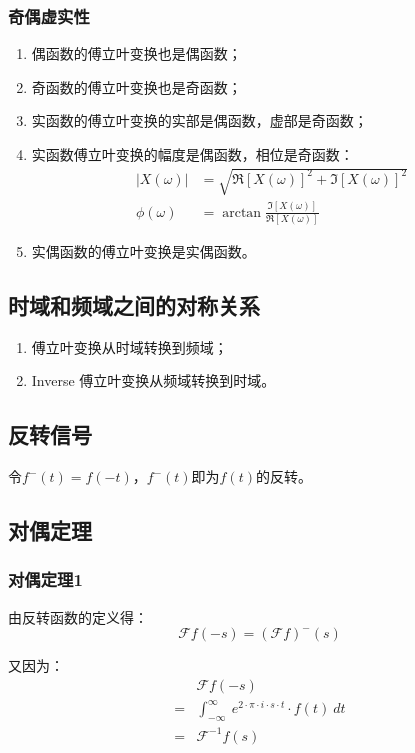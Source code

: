 \subsubsection{奇偶虚实性}
\begin{enumerate}
	\item 偶函数的傅立叶变换也是偶函数；
	\item 奇函数的傅立叶变换也是奇函数；
	\item 实函数的傅立叶变换的实部是偶函数，虚部是奇函数；
	\item 实函数傅立叶变换的幅度是偶函数，相位是奇函数：
	      \begin{align*}
		      |X(\omega)|  & =\sqrt{\Re[X(\omega)]^2+\Im[X(\omega)]^2}     \\
		      \phi(\omega) & =\arctan\frac{\Im[X(\omega)]}{\Re[X(\omega)]}
	      \end{align*}
	\item 实偶函数的傅立叶变换是实偶函数。

\end{enumerate}
\subsection{时域和频域之间的对称关系}
\begin{enumerate}
	\item 傅立叶变换从时域转换到频域；
	\item Inverse 傅立叶变换从频域转换到时域。
\end{enumerate}
\subsection{反转信号}
令$f^-(t)=f(-t)$，$f^-(t)$即为$f(t)$的反转。

\subsection{对偶定理}
\subsubsection{对偶定理1}
由反转函数的定义得：
$$
	\mathcal{F}f(-s)=(\mathcal{F}f)^-(s)
$$

又因为：
\begin{align*}
	  & \mathcal{F}f(-s)                                                           \\
	= & \int_{-\infty}^{\infty}\ e^{2\cdot \pi\cdot i\cdot s\cdot t}\cdot f(t)\ dt \\
	= & \mathcal{F}^{-1}f(s)
\end{align*}

